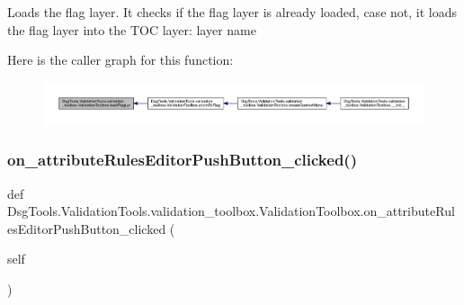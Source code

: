 \begin{DoxyVerb}Loads the flag layer. It checks if the flag layer is already loaded, case not, it loads the flag layer into the TOC
layer: layer name
\end{DoxyVerb}
 Here is the caller graph for this function\+:
\nopagebreak
\begin{figure}[H]
\begin{center}
\leavevmode
\includegraphics[width=350pt]{class_dsg_tools_1_1_validation_tools_1_1validation__toolbox_1_1_validation_toolbox_a27ccb8e739581f57ad7b112a937ffc0f_icgraph}
\end{center}
\end{figure}
\mbox{\label{class_dsg_tools_1_1_validation_tools_1_1validation__toolbox_1_1_validation_toolbox_ad33583168503d8be644e2fd130c4b2b0}} 
\subsubsection{\texorpdfstring{on\+\_\+attribute\+Rules\+Editor\+Push\+Button\+\_\+clicked()}{on\_attributeRulesEditorPushButton\_clicked()}}
{\footnotesize\ttfamily def Dsg\+Tools.\+Validation\+Tools.\+validation\+\_\+toolbox.\+Validation\+Toolbox.\+on\+\_\+attribute\+Rules\+Editor\+Push\+Button\+\_\+clicked (\begin{DoxyParamCaption}\item[{}]{self }\end{DoxyParamCaption})}

